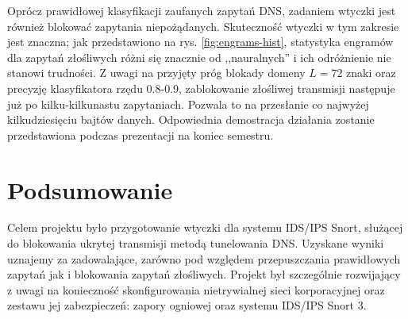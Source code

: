 \documentclass{eiti-raport}
\begin{document}
Oprócz prawidłowej klasyfikacji zaufanych zapytań DNS, zadaniem wtyczki jest również blokować zapytania niepożądanych. Skuteczność wtyczki w tym zakresie jest znaczna; jak przedstawiono na rys. \ref{fig:engrams-hist}, statystyka engramów dla zapytań złośliwych różni się znacznie od ,,nauralnych'' i ich odróżnienie nie stanowi trudności. Z uwagi na przyjęty próg blokady domeny $L = 72$ znaki oraz precyzję klasyfikatora rzędu 0.8-0.9, zablokowanie złośliwej transmisji następuje już po kilku-kilkunastu zapytaniach. Pozwala to na przesłanie co najwyżej kilkudziesięciu bajtów danych. Odpowiednia demostracja działania zostanie przedstawiona podczas prezentacji na koniec semestru. 

\section{Podsumowanie} \label{sec:summary}
Celem projektu było przygotowanie wtyczki dla systemu IDS/IPS Snort, służącej do blokowania ukrytej transmisji metodą tunelowania DNS. Uzyskane wyniki uznajemy za zadowalające, zarówno pod względem przepuszczania prawidłowych zapytań jak i blokowania zapytań złośliwych. Projekt był szczególnie rozwijający z uwagi na konieczność skonfigurowania nietrywialnej sieci korporacyjnej oraz zestawu jej zabezpieczeń: zapory ogniowej oraz systemu IDS/IPS Snort 3. 
\end{document}
